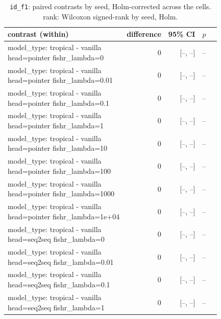 \documentclass[10pt]{article}
\makeatletter
\newcommand{\stackcell}[1]{\begin{tabular}[t]{@{}l@{}}#1\end{tabular}}
\makeatother
\begin{document}
{\small
\begin{longtable}{lrrrl}
\caption{\texttt{id\_f1}: paired contrasts by seed, Holm-corrected across the cells. rank: Wilcoxon signed-rank by seed, Holm.}\label{tab:paired-id_f1}\\
\toprule
contrast (within) & difference & 95\% CI & $p$ & \\
\midrule
\endhead
\stackcell{model\_type: tropical - vanilla\\\footnotesize head=pointer fishr\_lambda=0 } & 0 & [--, --] & -- & \\
\stackcell{model\_type: tropical - vanilla\\\footnotesize head=pointer fishr\_lambda=0.01 } & 0 & [--, --] & -- & \\
\stackcell{model\_type: tropical - vanilla\\\footnotesize head=pointer fishr\_lambda=0.1 } & 0 & [--, --] & -- & \\
\stackcell{model\_type: tropical - vanilla\\\footnotesize head=pointer fishr\_lambda=1 } & 0 & [--, --] & -- & \\
\stackcell{model\_type: tropical - vanilla\\\footnotesize head=pointer fishr\_lambda=10 } & 0 & [--, --] & -- & \\
\stackcell{model\_type: tropical - vanilla\\\footnotesize head=pointer fishr\_lambda=100 } & 0 & [--, --] & -- & \\
\stackcell{model\_type: tropical - vanilla\\\footnotesize head=pointer fishr\_lambda=1000 } & 0 & [--, --] & -- & \\
\stackcell{model\_type: tropical - vanilla\\\footnotesize head=pointer fishr\_lambda=1e+04 } & 0 & [--, --] & -- & \\
\stackcell{model\_type: tropical - vanilla\\\footnotesize head=seq2seq fishr\_lambda=0 } & 0 & [--, --] & -- & \\
\stackcell{model\_type: tropical - vanilla\\\footnotesize head=seq2seq fishr\_lambda=0.01 } & 0 & [--, --] & -- & \\
\stackcell{model\_type: tropical - vanilla\\\footnotesize head=seq2seq fishr\_lambda=0.1 } & 0 & [--, --] & -- & \\
\stackcell{model\_type: tropical - vanilla\\\footnotesize head=seq2seq fishr\_lambda=1 } & 0 & [--, --] & -- & \\

\end{longtable}}
\end{document}
